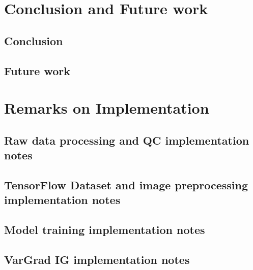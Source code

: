 \documentclass[biblatexBackend=bibtex]{tumthesis}
\begin{document}
\chapter{Conclusion and Future work}

\section{Conclusion}


\section{Future work}


\appendix

\chapter{Remarks on Implementation}
\label{Appendix-Implementation}


\section{Raw data processing and QC implementation notes}
\label{sec:appendix:raw_data}


\section{TensorFlow Dataset and image preprocessing implementation notes}
\label{sec:appendix:tfds}


\section{Model training implementation notes}
\label{sec:appendix:Model_training_IN}


\section{VarGrad IG implementation notes}
\label{sec:appendix:VarGrad_IG_Experimental_Setup}

\end{document}
